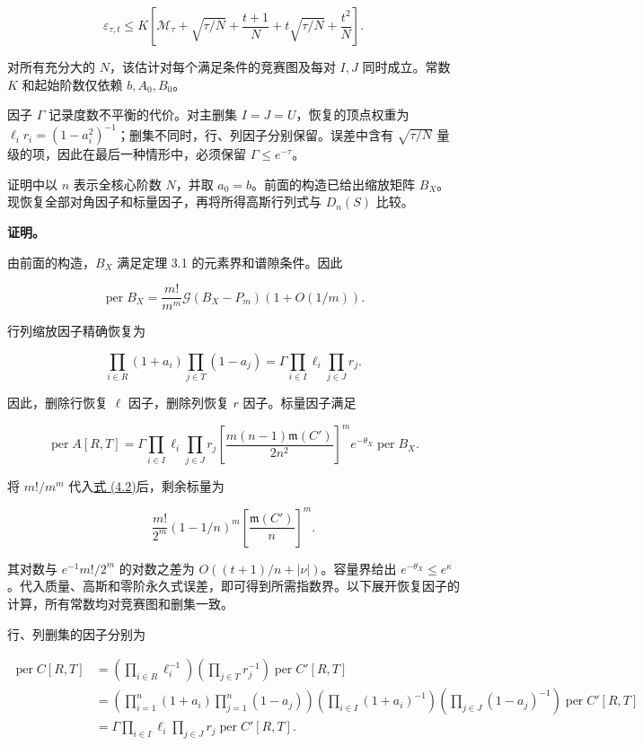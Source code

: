 \documentclass[11pt,a4paper]{article}
\begin{document}
\[
\varepsilon_{\tau,t}\le K\left[
\mathcal M_\tau+\sqrt{\tau/N}+\frac{t+1}{N}
+t\sqrt{\tau/N}+\frac{t^2}{N}\right].
\]

对所有充分大的 \(N\)，该估计对每个满足条件的竞赛图及每对 \(I,J\) 同时成立。常数 \(K\) 和起始阶数仅依赖 \(b,A_0,B_0\)。

因子 \(\Gamma\) 记录度数不平衡的代价。对主删集 \(I=J=U\)，恢复的顶点权重为 \(\ell_i r_i=(1-a_i^2)^{-1}\)；删集不同时，行、列因子分别保留。误差中含有 \(\sqrt{\tau/N}\) 量级的项，因此在最后一种情形中，必须保留 \(\Gamma\le e^{-\tau}\)。

证明中以 \(n\) 表示全核心阶数 \(N\)，并取 \(a_0=b\)。前面的构造已给出缩放矩阵 \(B_X\)。现恢复全部对角因子和标量因子，再将所得高斯行列式与 \(D_n(S)\) 比较。

\textbf{证明。}

由前面的构造，\(B_X\) 满足定理 3.1 的元素界和谱隙条件。因此

\[
\operatorname{per}B_X=\frac{m!}{m^m}\mathcal G(B_X-P_m)(1+O(1/m)).
\]

行列缩放因子精确恢复为

\[
\prod_{i\in R}(1+a_i)\prod_{j\in T}(1-a_j)=\Gamma\prod_{i\in I}\ell_i\prod_{j\in J}r_j.
\]

因此，删除行恢复 \(\ell\) 因子，删除列恢复 \(r\) 因子。标量因子满足

\begin{equation}
\operatorname{per}A[R,T]=\Gamma\prod_{i\in I}\ell_i\prod_{j\in J}r_j\left[\frac{m(n-1)\mathfrak m(C')}{2n^2}\right]^m e^{-\theta_X}\operatorname{per}B_X.
\tag{4.2}
\label{eq-exact-restoration}
\end{equation}

将 \(m!/m^m\) 代入\hyperref[eq-exact-restoration]{式 (4.2)}后，剩余标量为

\[
\frac{m!}{2^m}(1-1/n)^m\left[\frac{\mathfrak m(C')}{n}\right]^m.
\]

其对数与 \(e^{-1}m!/2^m\) 的对数之差为 \(O((t+1)/n+|\nu|)\)。容量界给出 \(e^{-\theta_X}\le e^\kappa\)。代入质量、高斯和零阶永久式误差，即可得到所需指数界。以下展开恢复因子的计算，所有常数均对竞赛图和删集一致。

行、列删集的因子分别为

\[
\begin{aligned}
\operatorname{per}C[R,T]
&=\left(\prod_{i\in R}\ell_i^{-1}\right)
\left(\prod_{j\in T}r_j^{-1}\right)\operatorname{per}C'[R,T]\\
&=\left(\prod_{i=1}^n(1+a_i)\prod_{j=1}^n(1-a_j)\right)
\left(\prod_{i\in I}(1+a_i)^{-1}\right)
\left(\prod_{j\in J}(1-a_j)^{-1}\right)\operatorname{per}C'[R,T]\\
&=\Gamma\prod_{i\in I}\ell_i\prod_{j\in J}r_j\operatorname{per}C'[R,T].
\end{aligned}
\]
\end{document}
